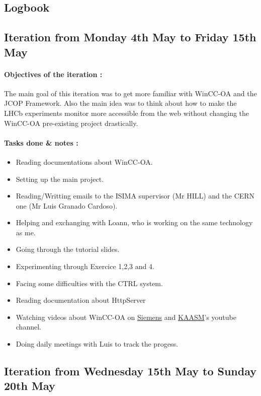 \documentclass[../main.tex]{subfiles}
\begin{document}
\newpage
\appendixpage
\begin{appendix}
    \section{Logbook}
    \subsection{Iteration from Monday 4th May to Friday 15th May}
    \paragraph{Objectives of the iteration :} 
    The main goal of this iteration was to get more familiar with WinCC-OA and the JCOP Framework. 
    Also the main idea was to think about how to make the LHCb experiments monitor more accessible from the web without changing the WinCC-OA pre-existing project drastically.
    \paragraph{Tasks done \& notes :}
    \begin{itemize}
        \item Reading documentations about WinCC-OA.
        \item Setting up the main project.
        \item Reading/Writting emails to the ISIMA supervisor (Mr HILL) and the CERN one (Mr Luis Granado Cardoso).
        \item Helping and exchanging with Loann, who is working on the same technology as me.
        \item Going through the tutorial slides.
        \item Experimenting through Exercice 1,2,3 and 4.
        \item Facing some difficulties with the CTRL system.
        \item Reading documentation about HttpServer
        \item Watching videos about WinCC-OA on \href{https://www.youtube.com/user/ETM2011}{Siemens} and \href{https://www.youtube.com/channel/UCGBnHd1-B-Zg9MDsjTk0-Sw}{KAASM}'s youtube channel. 
        \item Doing daily meetings with Luis to track the progess.
    \end{itemize}

    \subsection{Iteration from Wednesday 15th May to Sunday 20th May}

\end{appendix}
\end{document}
